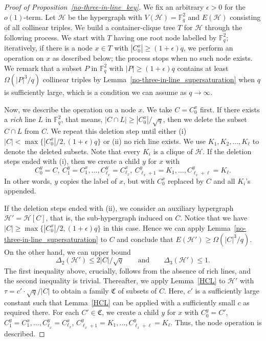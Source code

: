 \documentclass[11pt]{article}
\theoremstyle{definition}
\begin{document}
\begin{proof}[Proof of Proposition~\ref{no-three-in-line_key}]
    We fix an arbitrary $\epsilon > 0$ for the $o(1)$-term. Let $\mathcal{H}$ be the hypergraph with $V(\mathcal{H}) = \mathbb{F}^2_q$ and $E(\mathcal{H})$ consisting of all collinear triples. We build a container-clique tree $T$ for $\mathcal{H}$ through the following process. We start with $T$ having one root node labelled by $\mathbb{F}_q^2$; iteratively, if there is a node $x \in T$ with $|C^x_0| \geq (1+\epsilon)q$, we perform an operation on $x$ as described below; the process stops when no such node exists. We remark that a subset $P$ in $\mathbb{F}_q^2$ with $|P| \geq (1+\epsilon)q$ contains at least $\Omega(|P|^3/q)$ collinear triples by Lemma~\ref{no-three-in-line_supersaturation} when $q$ is sufficiently large, which is a condition we can assume as $q \to \infty$.

    Now, we describe the operation on a node $x$. We take $C = C^x_0$ first. If there exists a \textit{rich} line $L$ in $\mathbb{F}_q^2$, that means, $|C \cap L| \geq |C^x_0|/\sqrt{q}$, then we delete the subset $C \cap L$ from $C$. We repeat this deletion step until either (i) $|C| < \max\{|C^x_0|/2,(1+\epsilon)q\}$ or (ii) no rich line exists. We use $K_1,K_2,\dots,K_\ell$ to denote the deleted subsets. Note that every $K_i$ is a clique of $\mathcal{H}$. If the deletion steps ended with (i), then we create a child $y$ for $x$ with \begin{equation*}
        C^y_0 = C,~ C^y_1 = C^x_1, \dots, C^y_{\ell_x}=C^x_{\ell_x},~ C^y_{\ell_x+1} = K_1,\dots, C^y_{\ell_x+\ell} = K_\ell.
    \end{equation*} In other words, $y$ copies the label of $x$, but with $C^x_0$ replaced by $C$ and all $K_i$'s appended.
    
    If the deletion steps ended with (ii), we consider an auxiliary hypergraph $\mathcal{H}' = \mathcal{H}[C]$, that is, the sub-hypergraph induced on $C$. Notice that we have $|C| \geq \max\{|C^x_0|/2,(1+\epsilon)q\}$ in this case. Hence we can apply Lemma~\ref{no-three-in-line_supersaturation} to $C$ and conclude that $E(\mathcal{H}') \geq \Omega(|C|^3/q)$. On the other hand, we can upper bound \begin{equation*}
        \Delta_2(\mathcal{H}') \leq 2|C|/\sqrt{q} \qquad\text{and}\qquad \Delta_3(\mathcal{H}') \leq 1.
    \end{equation*} The first inequality above, crucially, follows from the absence of rich lines, and the second inequality is trivial. Thereafter, we apply Lemma~\ref{HCL} to $\mathcal{H}'$ with $\tau = c' \cdot \sqrt{q}/|C|$ to obtain a family $\mathfrak{C}$ of subsets of $C$. Here, $c'$ is a sufficiently large constant such that Lemma~\ref{HCL} can be applied with a sufficiently small $c$ as required there. For each $C' \in \mathfrak{C}$, we create a child $y$ for $x$ with $C^y_0 = C'$, $C^y_1 = C^x_1, \dots, C^y_{\ell_x}=C^x_{\ell_x}$, $C^y_{\ell_x+1} = K_1,\dots, C^y_{\ell_x+\ell} = K_\ell$. Thus, the node operation is described.


\end{proof}
\end{document}
